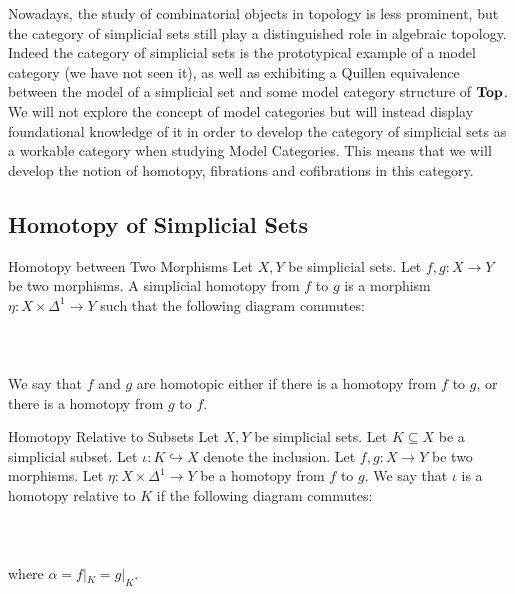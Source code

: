 \documentclass[a4paper]{article}
\begin{document}
Nowadays, the study of combinatorial objects in topology is less prominent, but the category of simplicial sets still play a distinguished role in algebraic topology. Indeed the category of simplicial sets is the prototypical example of a model category (we have not seen it), as well as exhibiting a Quillen equivalence between the model of a simplicial set and some model category structure of $\bold{Top}$. We will not explore the concept of model categories but will instead display foundational knowledge of it in order to develop the category of simplicial sets as a workable category when studying Model Categories. This means that we will develop the notion of homotopy, fibrations and cofibrations in this category. 

\subsection{Homotopy of Simplicial Sets}
\begin{defn}{Homotopy between Two Morphisms}{} Let $X,Y$ be simplicial sets. Let $f,g:X\to Y$ be two morphisms. A simplicial homotopy from $f$ to $g$ is a morphism $\eta:X\times\Delta^1\to Y$ such that the following diagram commutes: \\~\\
\\~\\
We say that $f$ and $g$ are homotopic either if there is a homotopy from $f$ to $g$, or there is a homotopy from $g$ to $f$. 
\end{defn}

\begin{defn}{Homotopy Relative to Subsets}{} Let $X,Y$ be simplicial sets. Let $K\subseteq X$ be a simplicial subset. Let $\iota:K\hookrightarrow X$ denote the inclusion. Let $f,g:X\to Y$ be two morphisms. Let $\eta:X\times\Delta^1\to Y$ be a homotopy from $f$ to $g$. We say that $\iota$ is a homotopy relative to $K$ if the following diagram commutes: \\~\\
\\~\\
where $\alpha=f|_K=g|_K$. 
\end{defn}
\end{document}
